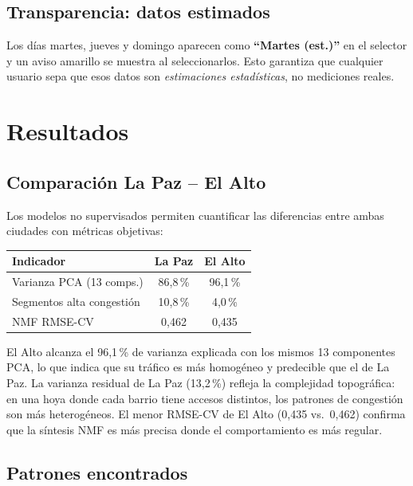 \documentclass[12pt,a4paper]{article}
\begin{document}
\subsection{Transparencia: datos estimados}

Los días martes, jueves y domingo aparecen como \textbf{``Martes (est.)''}
en el selector y un aviso amarillo se muestra al seleccionarlos.
Esto garantiza que cualquier usuario sepa que esos datos son
\emph{estimaciones estadísticas}, no mediciones reales.

\section{Resultados}

\subsection{Comparación La Paz -- El Alto}

Los modelos no supervisados permiten cuantificar las diferencias entre
ambas ciudades con métricas objetivas:

\begin{center}
\begin{tabular}{lcc}
  \toprule
  Indicador & La Paz & El Alto \\
  \midrule
  Varianza PCA (13 comps.) & 86{,}8\,\% & 96{,}1\,\% \\
  Segmentos alta congestión & 10{,}8\,\% & 4{,}0\,\% \\
  NMF RMSE-CV              & 0{,}462    & 0{,}435 \\
  \bottomrule
\end{tabular}
\end{center}

El Alto alcanza el 96{,}1\,\% de varianza explicada con los mismos 13
componentes PCA, lo que indica que su tráfico es más homogéneo y
predecible que el de La Paz.
La varianza residual de La Paz (13{,}2\,\%) refleja la complejidad
topográfica: en una hoya donde cada barrio tiene accesos distintos,
los patrones de congestión son más heterogéneos.
El menor RMSE-CV de El Alto (0{,}435 vs.\ 0{,}462) confirma que la
síntesis NMF es más precisa donde el comportamiento es más regular.

\subsection{Patrones encontrados}
\end{document}
